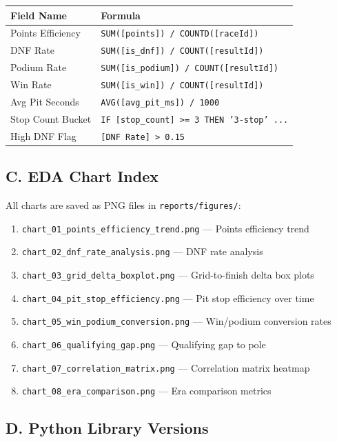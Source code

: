 \documentclass[12pt, a4paper]{article}
\begin{document}
\begin{longtable}{l l}
\toprule
\textbf{Field Name} & \textbf{Formula} \\
\midrule
Points Efficiency  & \texttt{SUM([points]) / COUNTD([raceId])} \\
DNF Rate           & \texttt{SUM([is\_dnf]) / COUNT([resultId])} \\
Podium Rate        & \texttt{SUM([is\_podium]) / COUNT([resultId])} \\
Win Rate           & \texttt{SUM([is\_win]) / COUNT([resultId])} \\
Avg Pit Seconds    & \texttt{AVG([avg\_pit\_ms]) / 1000} \\
Stop Count Bucket  & \texttt{IF [stop\_count] >= 3 THEN '3-stop' ...} \\
High DNF Flag      & \texttt{[DNF Rate] > 0.15} \\
\bottomrule
\end{longtable}

\subsection*{C. EDA Chart Index}
All charts are saved as PNG files in \texttt{reports/figures/}:

\begin{enumerate}
    \item \texttt{chart\_01\_points\_efficiency\_trend.png} --- Points efficiency trend
    \item \texttt{chart\_02\_dnf\_rate\_analysis.png} --- DNF rate analysis
    \item \texttt{chart\_03\_grid\_delta\_boxplot.png} --- Grid-to-finish delta box plots
    \item \texttt{chart\_04\_pit\_stop\_efficiency.png} --- Pit stop efficiency over time
    \item \texttt{chart\_05\_win\_podium\_conversion.png} --- Win/podium conversion rates
    \item \texttt{chart\_06\_qualifying\_gap.png} --- Qualifying gap to pole
    \item \texttt{chart\_07\_correlation\_matrix.png} --- Correlation matrix heatmap
    \item \texttt{chart\_08\_era\_comparison.png} --- Era comparison metrics
\end{enumerate}

\subsection*{D. Python Library Versions}
\end{document}
